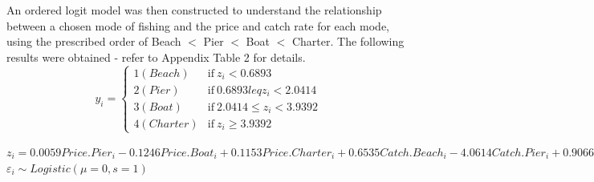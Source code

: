 \documentclass[12pt]{article}
\begin{document}
{An ordered logit model was then constructed to understand the relationship between a chosen mode of fishing and the price and catch rate for each mode, using the prescribed order of Beach $<$ Pier $<$ Boat $<$ Charter. The following results were obtained - refer to Appendix Table 2 for details.\\

$$y_i = \begin{cases}
1(Beach) & \text{if} \: z_i < 0.6893\\
2(Pier) & \text{if} \: 0.6893 leq z_i < 2.0414\\
3(Boat) & \text{if} \: 2.0414 \leq z_i < 3.9392\\
4(Charter) & \text{if} \: z_i \geq 3.9392
\end{cases}$$

$z_i = 0.0059Price.Pier_i - 0.1246Price.Boat_i + 0.1153Price.Charter_i + 0.6535Catch.Beach_i - 4.0614Catch.Pier_i + 0.9066Catch.Boat_i + 0.1986Catch.Charter_i + \varepsilon_i$\\

$\varepsilon_i \sim Logistic(\mu = 0, s = 1)$

}
\end{document}
